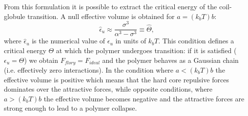 \documentclass[12pt,a4paper,notitlepage]{article}
\begin{document}
From this formulation it is possible to extract the critical energy of the
coil-globule transition. A null effective volume is obtained for 
$a = (k_b T) b$:
\begin{equation}
  \hat \epsilon_u \approx \frac{\sigma^3}{\alpha^3 -  \sigma^3} \equiv \hat \Theta,
\label{eq:theta}
\end{equation}
where $\hat \epsilon_u$ is the numerical value of $\epsilon_u$ in
units of $k_bT$.
This condition defines a critical energy $\Theta$ at which the
polymer undergoes transition: if it is satisfied ($\epsilon_u = \Theta$) we
obtain $F_{flory} = F_{ideal}$ and the polymer behaves as a Gaussian
chain (i.e. effectively zero interactions). In the condition where $a
< (k_b T)b$ the effective volume is positive which means that the hard
core repulsive forces dominates over the attractive forces, while
opposite conditions, where $a > (k_bT)b$ the effective volume becomes
negative and the attractive forces are strong enough to lead to a
polymer collapse.
\end{document}
